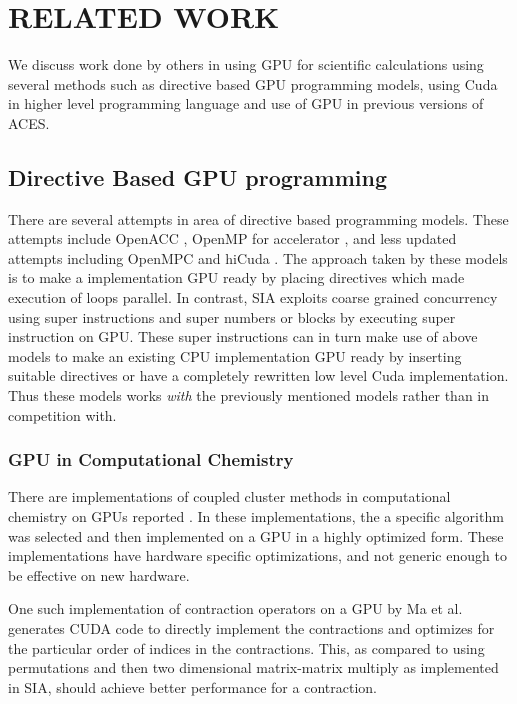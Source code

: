 \chapter{RELATED WORK} \label{lit}

We discuss work done by others in using GPU for scientific calculations using
several methods such as directive based GPU programming models, using Cuda in
higher level programming language and use of GPU in previous versions of ACES.

\section{Directive Based GPU programming}
There are several attempts in area of directive based programming models. These
attempts include OpenACC \cite{openacc}, OpenMP for accelerator
\cite{openmpforaccelerators}, and less updated attempts including OpenMPC
\cite{openmpc} and hiCuda \cite{hicuda}. The approach taken by these models
is to make a implementation GPU ready by placing directives which made
execution of loops parallel. In contrast, SIA exploits coarse grained
concurrency using super instructions and super numbers or blocks by executing
super instruction on GPU. These super instructions can in turn make use of above
models to make an existing CPU implementation GPU ready by inserting suitable
directives or have a completely rewritten low level Cuda implementation. Thus
these models works \textit{with} the previously mentioned models rather than in
competition with.

\subsection{GPU in Computational Chemistry}

There are implementations of coupled cluster methods in computational chemistry
on GPUs reported \cite{bhaskar2013}\cite{deprince2011}\cite{maw2011}. In these
implementations, the a specific algorithm was selected and then implemented on a
GPU in a highly optimized form. These implementations have hardware specific
optimizations, and not generic enough to be effective on new hardware.

One such implementation of contraction operators on a GPU by Ma et al. generates
CUDA code to directly implement the contractions and optimizes for the
particular order of indices in the contractions. This, as compared to using
permutations and then two dimensional matrix-matrix multiply as implemented in
SIA, should achieve better performance for a contraction.

